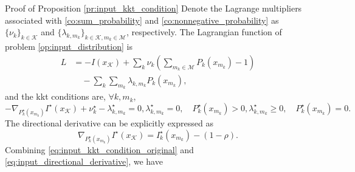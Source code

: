 \documentclass[journal]{IEEEtran}
\begin{document}
\begin{appendix}
	\begin{subsection}{Proof of Proposition \ref{pr:input_kkt_condition}}
		Denote the Lagrange multipliers associated with \eqref{co:sum_probability} and \eqref{co:nonnegative_probability} as $\{\nu_k\}_{k \in \mathcal{K}}$ and $\{\lambda_{k,m_k}\}_{k \in \mathcal{K},m_k \in \mathcal{M}}$, respectively.
		The Lagrangian function of problem \eqref{op:input_distribution} is
		\begin{align}
			L
			 & = - I(x_{\mathcal{K}}) + \sum_k \nu_k \left( \sum_{m_k \in \mathcal{M}} P_k(x_{m_k}) - 1 \right)\nonumber \\
			 & \quad - \sum_k \sum_{m_k} \lambda_{k,m_k} P_k(x_{m_k}),
		\end{align}
		and the \gls{kkt} conditions are, $\forall k,m_k$,
		\begin{subequations}
			\label{eq:input_kkt_condition_original}
			\begin{equation}
				- \nabla_{P_k^\star(x_{m_k})} I^\star(x_{\mathcal{K}}) + \nu_k^\star - \lambda_{k,m_k}^\star = 0,
			\end{equation}
			\begin{equation}
				\lambda_{k,m_k}^\star = 0, \quad P_k^\star(x_{m_k}) > 0,
			\end{equation}
			\begin{equation}
				\lambda_{k,m_k}^\star \ge 0, \quad P_k^\star(x_{m_k}) = 0.
			\end{equation}
		\end{subequations}
		The directional derivative can be explicitly expressed as
		\begin{equation}
			\nabla_{P_k^\star(x_{m_k})} I^\star(x_{\mathcal{K}}) = I_k^\star(x_{m_k}) - (1 - \rho).
			\label{eq:input_directional_derivative}
		\end{equation}
		Combining \eqref{eq:input_kkt_condition_original} and \eqref{eq:input_directional_derivative}, we have

\end{subsection}
\end{appendix}
\end{document}
